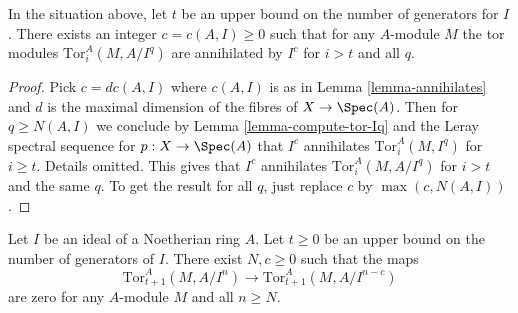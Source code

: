 \begin{lemma}
\label{lemma-annihilates-tors}
In the situation above, let $t$ be an upper bound on the number of
generators for $I$. There exists an integer $c = c(A, I) \geq 0$
such that for any $A$-module $M$ the tor modules
$\text{Tor}_i^A(M, A/I^q)$ are annihilated by $I^c$ for $i > t$
and all $q$.
\end{lemma}

\begin{proof}
Pick $c = dc(A, I)$ where $c(A, I)$ is as in Lemma \ref{lemma-annihilates}
and $d$ is the maximal dimension of the fibres of $X \to \Spec(A)$.
Then for $q \geq N(A, I)$ we conclude by Lemma \ref{lemma-compute-tor-Iq}
and the Leray spectral sequence for $p : X \to \Spec(A)$ that
$I^c$ annihilates $\text{Tor}_i^A(M, I^q)$ for $i \geq t$.
Details omitted. This gives that $I^c$ annihilates
$\text{Tor}_i^A(M, A/I^q)$ for $i > t$ and the same $q$.
To get the result for all $q$, just replace $c$ by $\max(c, N(A, I))$.
\end{proof}

\begin{lemma}
\label{lemma-tor-maps-vanish}
Let $I$ be an ideal of a Noetherian ring $A$. Let $t \geq 0$
be an upper bound on the number of generators of $I$.
There exist $N, c \geq 0$ such that the maps
$$
\text{Tor}_{t + 1}^A(M, A/I^n) \to \text{Tor}_{t + 1}^A(M, A/I^{n - c})
$$
are zero for any $A$-module $M$ and all $n \geq N$.
\end{lemma}

